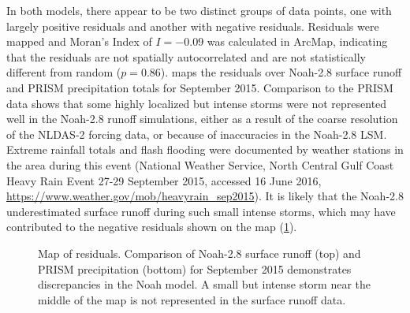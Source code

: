 \documentclass[preprint, review, authoryear, 12pt]{elsarticle}
\begin{document}
In both models, there appear to be two distinct groups of data points, one with largely positive residuals and another with negative residuals. Residuals were mapped and Moran's Index of $I=-0.09$ was calculated in \mbox{ArcMap}, indicating that the residuals are not spatially autocorrelated and are not statistically different from random ($p=0.86$).  maps the residuals over Noah-2.8 surface runoff and PRISM precipitation totals for September 2015. Comparison to the PRISM data shows that some highly localized but intense storms were not represented well in the Noah-2.8 runoff simulations, either as a result of the coarse resolution of the NLDAS-2 forcing data, or because of inaccuracies in the Noah-2.8 LSM. Extreme rainfall totals and flash flooding were documented by weather stations in the area during this event (National Weather Service, North Central Gulf Coast Heavy Rain Event
27-29 September 2015, accessed 16 June 2016, \url{https://www.weather.gov/mob/heavyrain_sep2015}). It is likely that the Noah-2.8 underestimated surface runoff during such small intense storms, which may have contributed to the negative residuals shown on the map (\cref{fig:model-residuals}).

\begin{figure}
\centering
{}
\caption{Map of residuals. Comparison of Noah-2.8 surface runoff (top) and PRISM precipitation (bottom) for September 2015 demonstrates discrepancies in the Noah model. A small but intense storm near the middle of the map is not represented in the surface runoff data.} \label{fig:model-residuals}
\end{figure}
\end{document}
